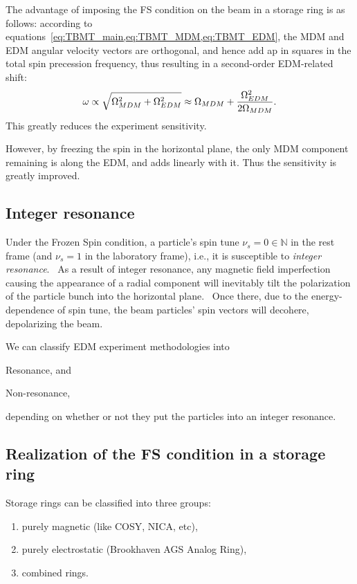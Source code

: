 \documentclass{article}
\begin{document}
The advantage of imposing the FS condition on the beam in a storage ring is as follows: according to equations~\cref{eq:TBMT_main,eq:TBMT_MDM,eq:TBMT_EDM}, the MDM and EDM angular velocity vectors are orthogonal, and hence add ap in squares in the total spin precession frequency, thus resulting in a second-order EDM-related shift:~\cite[p. 5]{Mane:SpinWheel}
\[
\omega \propto \sqrt{\Omega_{MDM}^2 + \Omega_{EDM}^2} \approx \Omega_{MDM} + \frac{\Omega_{EDM}^2}{2\Omega_{MDM}}.
\]
This greatly reduces the experiment sensitivity.

However, by freezing the spin in the horizontal plane, the only MDM component remaining is along the EDM, and adds linearly with it. Thus the sensitivity is greatly improved.

\subsection{Integer resonance}
Under the Frozen Spin condition, a particle's spin tune $\nu_s = 0 \in \mathbb{N}$ in the rest frame (and $\nu_s = 1$ in the laboratory frame), i.e., it is susceptible to \emph{integer resonance}.~\cite{COSY:ImperfectionResonance} As a result of integer resonance, any magnetic field imperfection causing the appearance of a radial component will inevitably tilt the polarization of the particle bunch into the horizontal plane.~\cite[p. 8]{COSY:ImperfectionResonance} Once there, due to the energy-dependence of spin tune, the beam particles' spin vectors will decohere, depolarizing the beam.

We can classify EDM experiment methodologies into
\begin{inparaenum}[1)]
\item Resonance, and
\item Non-resonance,
\end{inparaenum}
depending on whether or not they put the particles into an integer resonance.

\subsection{Realization of the FS condition in a storage ring}
Storage rings can be classified into three groups:
\begin{enumerate}
\item purely magnetic (like COSY, NICA, etc),
\item purely electrostatic (Brookhaven AGS Analog Ring),
\item combined rings.
\end{enumerate}
\end{document}
